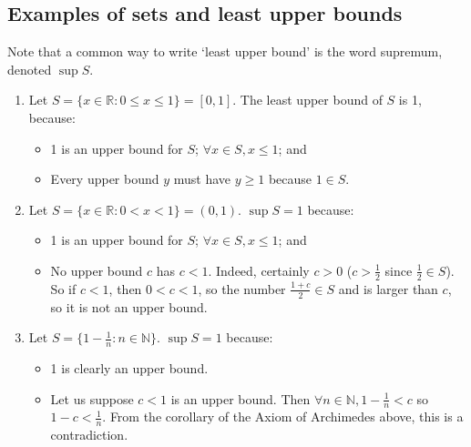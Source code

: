 \subsection{Examples of sets and least upper bounds}
Note that a common way to write `least upper bound' is the word supremum, denoted \(\sup S\).
\begin{enumerate}
	\item Let \(S = \{ x \in \mathbb R: 0 \leq x \leq 1 \} = [0, 1]\).
	      The least upper bound of \(S\) is 1, because:
	      \begin{itemize}
		      \item 1 is an upper bound for \(S\); \(\forall x \in S, x\leq1 \); and
		      \item Every upper bound \(y\) must have \(y \geq 1\) because \(1 \in S\).
	      \end{itemize}
	\item Let \(S = \{ x \in \mathbb R: 0 < x < 1 \} = (0, 1)\).
	      \(\sup S = 1\) because:
	      \begin{itemize}
		      \item 1 is an upper bound for \(S\); \(\forall x \in S, x \leq 1\); and
		      \item No upper bound \(c\) has \(c<1\).
		            Indeed, certainly \(c>0\) (\(c > \frac{1}{2}\) since \(\frac{1}{2} \in S\)).
		            So if \(c<1\), then \(0<c<1\), so the number \(\frac{1+c}{2} \in S\) and is larger than \(c\), so it is not an upper bound.
	      \end{itemize}
	\item Let \(S = \{ 1 - \frac{1}{n}: n \in \mathbb N \}\).
	      \(\sup S = 1\) because:
	      \begin{itemize}
		      \item 1 is clearly an upper bound.
		      \item Let us suppose \(c < 1\) is an upper bound.
		            Then \(\forall n \in \mathbb N, 1 - \frac{1}{n} < c\) so \(1 - c < \frac{1}{n}\).
		            From the corollary of the Axiom of Archimedes above, this is a contradiction.
	      \end{itemize}
\end{enumerate}
